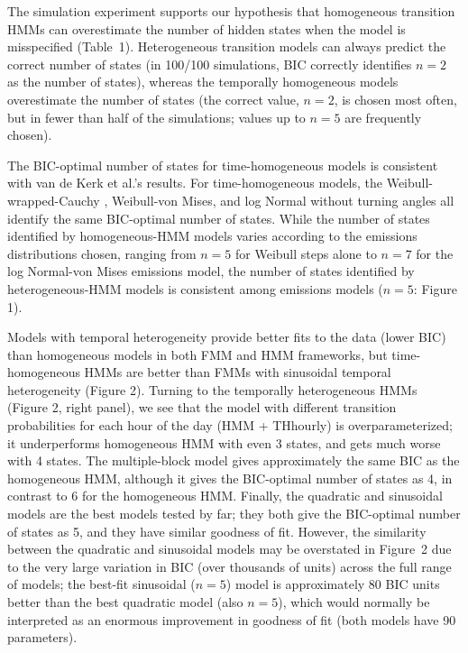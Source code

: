 \documentclass{bmcart}
\begin{document}
The simulation experiment supports our hypothesis that homogeneous transition HMMs can 
overestimate the number of hidden states when the model is misspecified (Table~1). Heterogeneous 
transition models can always predict the correct number of states (in 100/100 simulations, BIC 
correctly identifies $n=2$ as the number of states), whereas the temporally homogeneous models 
overestimate the number of states (the correct value, $n=2$, is chosen most often, but in fewer 
than half of the simulations; values up to $n=5$ are frequently chosen).

The BIC-optimal number of states for time-homogeneous models is
consistent with van de Kerk et al.'s \cite{kerk2015hidden}
results. For time-homogeneous models, the Weibull-wrapped-Cauchy
\cite{kerk2015hidden}, Weibull-von Mises, and log Normal without
turning angles all identify the same BIC-optimal number of
states. While the number of states identified
by homogeneous-HMM models varies according to the emissions
distributions chosen, ranging from $n=5$ for Weibull
steps alone to $n=7$ for the log Normal-von Mises emissions
model, the number of states identified
by heterogeneous-HMM models
is consistent among emissions models ($n=5$: Figure 1).


Models with temporal heterogeneity provide better fits to the data
(lower BIC) than homogeneous models in both FMM and HMM frameworks,
but time-homogeneous HMMs are better than FMMs with sinusoidal
temporal heterogeneity (Figure 2). Turning to the temporally
heterogeneous HMMs (Figure 2, right panel), we see that the model with
different transition probabilities for each hour of the day (HMM +
THhourly) is overparameterized; it underperforms homogeneous HMM with
even 3 states, and gets much worse with 4 states. The multiple-block
model gives approximately the same BIC as the homogeneous HMM,
although it gives the BIC-optimal number of states as 4, in contrast
to 6 for the homogeneous HMM.  Finally, the quadratic and sinusoidal
models are the best models tested by far; they both give the
BIC-optimal number of states as 5, and they have similar goodness of
fit.  However, the similarity between the quadratic 
and sinusoidal models may be overstated in Figure~2 due to the very large
variation in BIC (over thousands of units) across the full range of
models; the best-fit sinusoidal ($n=5$) model is approximately 80 BIC units
better than the best quadratic model (also $n=5$), which
would normally be interpreted as an enormous improvement in goodness of
fit (both models have 90 parameters).
\end{document}
